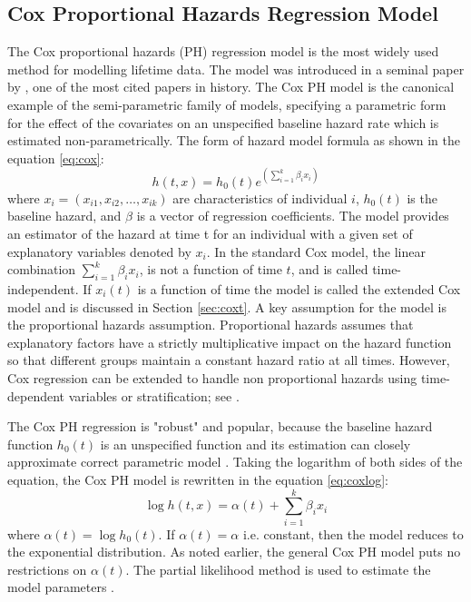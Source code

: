 \documentclass[12pt,letterpaper]{article}
\begin{document}
\subsection{Cox Proportional Hazards Regression Model} \label{Cox.mod}
The Cox proportional hazards (PH) regression model is the most widely used method for modelling lifetime data. The model was introduced in a seminal paper by \citet{cox1972}, one of the most cited papers in history. The Cox PH model is the canonical example of the semi-parametric family of models, specifying a parametric form for the effect of the covariates on an unspecified baseline hazard rate which is estimated non-parametrically.
The form of hazard model formula as shown in the equation \ref{eq:cox}:
\begin{equation}
	\label{eq:cox}
	h(t,x)=h_0(t)e^{(\sum_{i=1}^{k}\beta_ix_i)}
\end{equation}
where $x_i=(x_{i1}, x_{i2}, \ldots, x_{ik})$ are characteristics of individual $i$, $h_0(t)$ is the baseline hazard, and $\beta$  is a vector of regression coefficients.
The model provides an estimator of the hazard at time t for an individual with a given set of explanatory variables denoted by $x_i$.  In the standard Cox model, the linear combination $\sum_{i=1}^{k}\beta_i x_i$, is not a function of time $t$, and is called time-independent.  If $x_i(t)$ is a function of time the model is called the extended Cox model and is discussed in Section \ref{sec:coxt}. A key assumption for the model is the proportional hazards assumption. Proportional hazards assumes that explanatory factors have a strictly multiplicative impact on the hazard function so that different groups maintain a constant hazard ratio at all times. However, Cox regression can be extended to handle non proportional hazards using time-dependent variables or stratification; see \cite{kleinMosch2003}.

The Cox PH regression is "robust" and popular, because the baseline hazard function $h_0 (t)$ is an unspecified function and its estimation can closely approximate correct parametric model \citep{kleinbaum1998}. Taking the logarithm of both sides of the equation, the Cox PH model is rewritten in the equation \ref{eq:coxlog}:
\begin{equation}
	\label{eq:coxlog}
	\log{h(t,x)}=\alpha(t)+\sum_{i=1}^{k}\beta_ix_i
\end{equation}
where $\alpha(t)=\log{h_0(t)}$. If $\alpha(t)=\alpha$ i.e. constant, then the model reduces to the exponential distribution. As noted earlier, the general Cox PH model puts no restrictions on $\alpha(t)$.  The partial likelihood method is used to estimate the model parameters \citep{allison1995}. %
\end{document}

